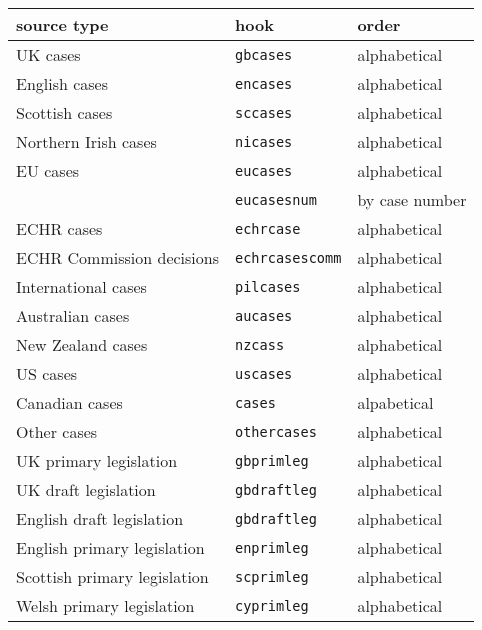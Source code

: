 \documentclass[a4paper,
               11pt,
	       DIV=1,			   
	       footinclude=false]
	      {scrartcl}
\begin{document}
\begin{table}
\centering
\small
{}
\begin{tabular}{lll}
\toprule
source type                          & hook                  & order \\
\midrule
UK cases                             & \texttt{gbcases}      & alphabetical\\
English cases                        & \texttt{encases}      & alphabetical\\
Scottish cases                       & \texttt{sccases}      & alphabetical\\
Northern Irish cases                 & \texttt{nicases}      & alphabetical\\
EU cases                             & \texttt{eucases}      & alphabetical \\
                                     & \texttt{eucasesnum}   & by case number \\
ECHR cases                           & \texttt{echrcase}     & alphabetical \\
ECHR Commission decisions            & \texttt{echrcasescomm}& alphabetical \\
International cases                  & \texttt{pilcases}     & alphabetical \\
Australian cases					 & \texttt{aucases}      & alphabetical \\
New Zealand cases                    & \texttt{nzcass}       & alphabetical \\
US cases                             & \texttt{uscases}      & alphabetical \\
Canadian cases                       & \texttt{cases}        & alpabetical \\
Other cases                          & \texttt{othercases}   & alphabetical \\
UK primary legislation               & \texttt{gbprimleg}    & alphabetical \\
UK draft legislation                 & \texttt{gbdraftleg}   & alphabetical \\
English draft legislation            & \texttt{gbdraftleg}   & alphabetical \\
English primary legislation          & \texttt{enprimleg}    & alphabetical \\
Scottish primary legislation         & \texttt{scprimleg}    & alphabetical \\
Welsh primary legislation            & \texttt{cyprimleg}    & alphabetical \\

\end{tabular}
\end{table}
\end{document}
